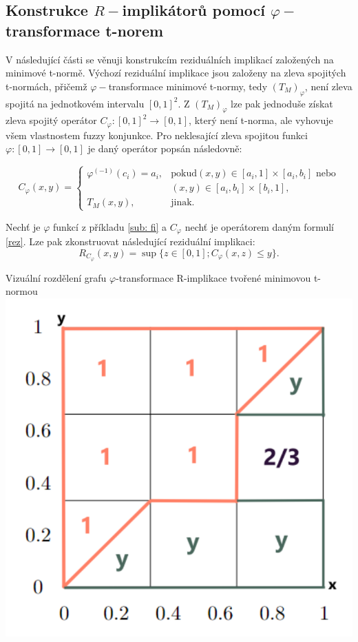 \subsection{Konstrukce $R-$implik\'ator\r u pomoc\'i $\varphi-$transformace t-norem}
V následující části se věnuji konstrukcím reziduálních implikací založených na minimové t-normě. Výchozí reziduální implikace jsou založeny na zleva spojitých t-normách, přičemž $\varphi-$transformace minimové t-normy, tedy $(T_M)_\varphi$, není zleva spojitá na jednotkovém intervalu $[0,1]^2$. Z $(T_M)_\varphi$ lze pak jednoduše získat zleva spojitý operátor $C_\varphi:[0,1]^2 \to [0,1]$, který není t-norma, ale vyhovuje všem vlastnostem fuzzy konjunkce. Pro neklesající zleva spojitou funkci $\varphi: [0,1] \to [0,1]$ je daný operátor popsán následovně:

\begin{equation} \label{rez}
    C_{\varphi}(x,y) = \begin{cases} \varphi^{(-1)}(c_i)=a_i, &\mbox {pokud
$(x,y)\in [a_i,1]\times[a_i,b_i]$ nebo}
\\ & (x,y)\in [a_i,b_i]\times[b_i,1],
\\ T_M(x,y), &\mbox {jinak.}
\end{cases} 
\end{equation} 

\begin{example}
Nech\v t je $\varphi$ funkcí z příkladu \ref{sub: fi} a $C_\varphi$ nech\v t je operátorem daným formulí \ref{rez}. Lze pak zkonstruovat následující reziduální implikaci: $$R_{C_\varphi}(x,y)=\sup\{z \in [0,1]; C_\varphi(x,z) \leq y\}.$$
    
    \begin{graph} Vizu\' aln\' i rozd\v elen\'i grafu $\varphi$-transformace R-implikace tvořené minimovou t-normou\\
        \centering
        \includegraphics[scale=0.8]{template-fig/RPhi-impl.pdf}
    \end{graph}
\end{example}


